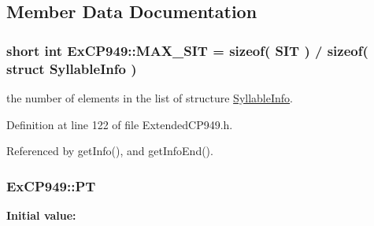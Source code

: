 \subsection{Member Data Documentation}
\hypertarget{classkmaOrange_1_1ExCP949_2bfe3d86204e992f440de9770e8aeec6}{
\subsubsection[{MAX\_\-SIT}]{\setlength{\rightskip}{0pt plus 5cm}short int {\bf ExCP949::MAX\_\-SIT} = sizeof( {\bf SIT} ) / sizeof( struct {\bf SyllableInfo} )}}
\label{classkmaOrange_1_1ExCP949_2bfe3d86204e992f440de9770e8aeec6}


the number of elements in the list of structure \hyperlink{structkmaOrange_1_1SyllableInfo}{SyllableInfo}. 



Definition at line 122 of file ExtendedCP949.h.

Referenced by getInfo(), and getInfoEnd().\hypertarget{classkmaOrange_1_1ExCP949_64c74c62aff0c87c7bbdf5bc270c2024}{
\subsubsection[{PT}]{ {\bf ExCP949::PT}}}
\label{classkmaOrange_1_1ExCP949_64c74c62aff0c87c7bbdf5bc270c2024}


\textbf{Initial value:}

